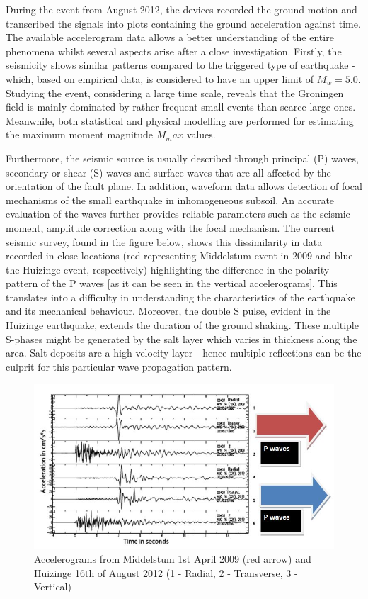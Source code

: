 \documentclass[12pt,a4paper]{report}
\begin{document}
During the event from August 2012, the devices recorded the ground motion and transcribed the signals into plots containing the ground acceleration against time. The available accelerogram data allows a better understanding of the entire phenomena whilst several aspects arise after a close investigation. Firstly, the seismicity shows similar patterns compared to the triggered type of earthquake - which, based on empirical data, is considered to have an upper limit of $M_w=5.0$. Studying the event, considering a large time scale, reveals that the Groningen field is mainly dominated by rather frequent small events than scarce large ones. Meanwhile, both statistical and physical modelling are performed for estimating the maximum moment magnitude $M_max$ values.

Furthermore, the seismic source is usually described through principal (P) waves, secondary or shear (S) waves and surface waves that are all affected by the orientation of the fault plane. In addition, waveform data allows detection of focal mechanisms of the small earthquake in inhomogeneous subsoil. An accurate evaluation of the waves further provides reliable parameters such as the seismic moment, amplitude correction along with the focal mechanism. The current seismic survey, found in the figure below, shows this dissimilarity in data recorded in close locations (red representing Middelstum event in 2009 and blue the Huizinge event, respectively) highlighting the difference in the polarity pattern of the P waves [as it can be seen in the vertical accelerograms]. This translates into a difficulty in understanding  the characteristics of the earthquake and its mechanical behaviour. Moreover, the double S pulse, evident in the Huizinge earthquake, extends the duration of the ground shaking. These multiple S-phases might be generated by the salt layer which varies in thickness along the area. Salt deposits are a high velocity layer - hence multiple reflections can be the culprit for this particular wave propagation pattern. 

\begin{figure}[h!]
	\centering
	\includegraphics[width=0.7\linewidth]{"Pwaves"}
	\caption[]{Accelerograms from Middelstum 1st April 2009 (red arrow) and Huizinge 16th of August 2012 (1 - Radial, 2 - Transverse, 3 - Vertical)}
	\label{Pwaves}
\end{figure}
\end{document}
